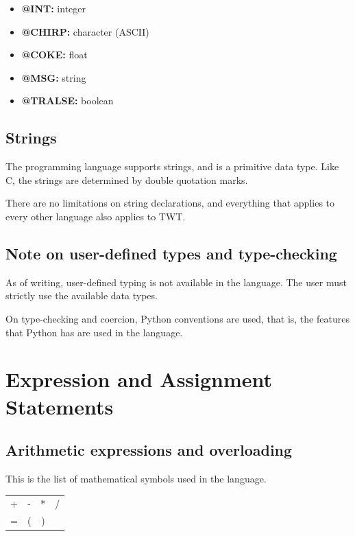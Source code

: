 \documentclass[11pt,a4paper]{report}
\begin{document}
\begin{itemize}
  \item \textbf{@INT:} integer
  \item \textbf{@CHIRP:} character (ASCII)
  \item \textbf{@COKE:} float
  \item \textbf{@MSG:} string
  \item \textbf{@TRALSE:} boolean
\end{itemize}

\section{Strings}

The programming language supports strings, and is a primitive data type. Like C,
the strings are determined by double quotation marks.\par

There are no limitations on string declarations, and everything that applies to
every other language also applies to TWT.

\section{Note on user-defined types and type-checking}

As of writing, user-defined typing is not available in the language. The user
must strictly use the available data types.\par

On type-checking and coercion, Python conventions are used, that is, the
features that Python has are used in the language.

\chapter{Expression and Assignment Statements}

\section{Arithmetic expressions and overloading}

This is the list of mathematical symbols used in the language.

\begin{center}
\begin{tabular}{ c c c c }
 + & - & * & / \\
 = & ( & )
\end{tabular}
\end{center}
\end{document}
